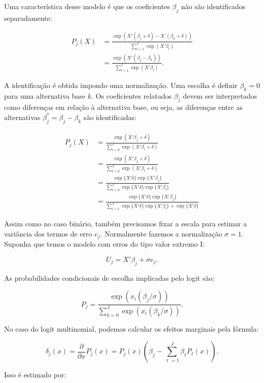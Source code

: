 \documentclass[12pt, a4paper, openany]{book}
\numberwithin{equation}{chapter}
\numberwithin{table}{chapter}
\numberwithin{figure}{chapter}
\theoremstyle{break}
\begin{document}
Uma característica desse modelo é que os coeficientes \( {\beta}_j \) não são identificados separadamente:

\begin{align*}
   P_j({X})  &= \frac{\exp\left( {X}' ({\beta}_j+ \delta) - {X}'({\beta}_k +\delta) \right)}{\sum_{l=1}^{J} \exp\left( {X}' {\beta}_l \right)} \\
   &= \frac{\exp\left( {X}' ({\beta}_j - {\beta}_k) \right)}{\sum_{l=1}^{J} \exp\left( {X}' {\beta}_l \right)}.
\end{align*}

A identificação é obtida impondo uma normalização. Uma escolha é definir \( {\beta}_k = 0 \) para uma alternativa base \( k \). Os coeficientes relatados \( {\beta}_j \) devem ser interpretados como diferenças em relação à alternativa base, ou seja, as diferenças entre as alternativas \( {\beta}_j^* = {\beta}_j - {\beta}_k \) são identificadas:

\begin{align*}
    P_j(X) &= \frac{\exp(X'\beta_j + \delta)}{\sum_{l=0}^J \exp(X'\beta_l + \delta)} \\
&= \frac{\exp(X'\beta_j + \delta)}{\sum_{l=0}^J \exp(X'\beta_l + \delta)} \\
&= \frac{\exp\{X'\delta\} \exp\{X'\beta_j\}}{\sum_{l=0}^J \exp\{X'\delta\} \exp\{X'\beta_l\}} \\
&= \frac{\exp\{X'\delta\} \exp\{X'\beta_j\}}{\sum_{l=1}^J \exp\{X'\delta\} \exp\{X'\beta_l\} + \exp\{X'\delta\}}
\end{align*}

Assim como no caso binário, também precisamos fixar a escala para estimar a variância dos termos de erro \( e_{j} \). Normalmente fazemos a normalização \( \sigma = 1 \). Suponha que temos o modelo com erros do tipo valor extremo I:

\[
U_{j} = {X}' {\beta}_j + \sigma e_{j}.
\]

As probabilidades condicionais de escolha implicadas pelo logit são:

\[
P_{j} = \frac{\exp\left( x_i ({\beta}_j / {\sigma}) \right)}{\sum_{k=0}^{J} \exp\left( x_i ({\beta}_k / {\sigma}) \right)}.
\]

No caso do logit multinomial, podemos calcular os efeitos marginais pela fórmula:

\[
\delta_j(x) = \frac{\partial}{\partial x} P_j(x) = P_j(x) \left( {\beta}_j - \sum_{\ell=1}^{J} {\beta}_\ell P_\ell(x) \right).
\]

Isso é estimado por:
\end{document}
